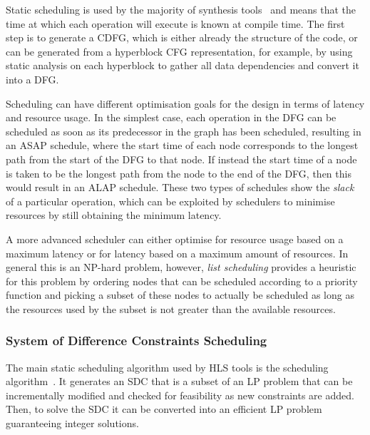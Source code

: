 Static scheduling is used by the majority of synthesis tools~\cite{canis13_l,
  amd23_vitis_high_synth,
  mentor20_catap_high_level_synth, intel20_sdk_openc_applic,
  roane23_autom_hw_sw_co_desig} and means that the time at which each operation
will execute is known at compile time.  The first step is to generate a
\gls{CDFG}, which is either already the structure of the code, or can be
generated from a \gls{hyperblock} \gls{CFG} representation, for example, by
using static analysis on each \gls{hyperblock} to gather all data dependencies
and convert it into a \gls{DFG}.

Scheduling can have different optimisation goals for the design in terms of
latency and resource usage.  In the simplest case, each operation in the
\gls{DFG} can be scheduled as soon as its predecessor in the graph has been
scheduled, resulting in an \gls{ASAP} schedule, where the start time of each
node corresponds to the longest path from the start of the \gls{DFG} to that
node.  If instead the start time of a node is taken to be the longest path from
the node to the end of the \gls{DFG}, then this would result in an \gls{ALAP}
schedule.  These two types of schedules show the \emph{slack} of a particular
operation, which can be exploited by schedulers to minimise resources by still
obtaining the minimum latency.

A more advanced scheduler can either optimise for resource usage based on a
maximum latency or for latency based on a maximum amount of resources.  In
general this is an NP-hard problem, however, \emph{\gls{list scheduling}}
provides a heuristic for this problem by ordering nodes that can be scheduled
according to a priority function and picking a subset of these nodes to actually
be scheduled as long as the resources used by the subset is not greater than the
available resources.

\subsubsection{System of Difference Constraints Scheduling}

The main static scheduling algorithm used by \gls{HLS} tools is the
 scheduling algorithm~\cite{cong06_sdc}.  It
generates an \gls{SDC} that is a subset of an \gls{LP} problem that can be
incrementally modified and checked for feasibility as new constraints are added.
Then, to solve the \gls{SDC} it can be converted into an efficient \gls{LP}
problem guaranteeing integer solutions.

